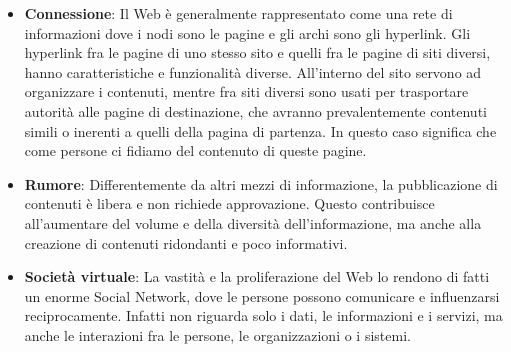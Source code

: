 \begin{itemize}
\item \textbf{Connessione}: Il Web è generalmente rappresentato come una rete di informazioni dove i nodi sono le pagine e gli archi sono gli hyperlink. Gli hyperlink fra le pagine di uno stesso sito e quelli fra le pagine di siti diversi, hanno caratteristiche e funzionalità diverse. All'interno del sito servono ad organizzare i contenuti, mentre fra siti diversi sono usati per trasportare autorità alle pagine di destinazione, che avranno prevalentemente contenuti simili o inerenti a quelli della pagina di partenza. In questo caso significa che come persone ci fidiamo del contenuto di queste pagine.

\item \textbf{Rumore}: 
Differentemente da altri mezzi di informazione, la pubblicazione di contenuti è libera e non richiede approvazione. Questo contribuisce all'aumentare del volume e della diversità dell'informazione, ma anche alla creazione di contenuti ridondanti e poco informativi.

\item \textbf{Società virtuale}: La vastità e la proliferazione del Web lo rendono di fatti un enorme Social Network, dove le persone possono comunicare e influenzarsi reciprocamente. Infatti non riguarda solo i dati, le informazioni e i servizi, ma anche le interazioni fra le persone, le organizzazioni o i sistemi.

\end{itemize}

